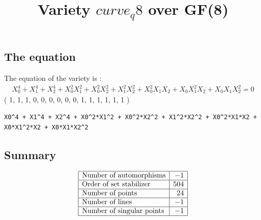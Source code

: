 \documentclass{article}
\newcommand\setTBstruts{\def\T{\rule{0pt}{2.6ex}}%
\def\B{\rule[-1.2ex]{0pt}{0pt}}}
\begin{document}
 
\setTBstruts



{\allowdisplaybreaks%






\title{Variety $curve_q8$ over GF(8)}
\author{}%
\maketitle%
%



\subsection*{The equation}
The equation of the variety  is :
{\renewcommand{\arraystretch}{1.5}
$$
\begin{array}{c}
X_0^4 + X_1^4 + X_2^4 + X_0^2X_1^2 + X_0^2X_2^2 + X_1^2X_2^2 + X_0^2X_1X_2 + X_0X_1^2X_2 + X_0X_1X_2^2=0
\end{array}
$$}
( 1, 1, 1, 0, 0, 0, 0, 0, 0, 1, 1, 1, 1, 1, 1 )\\
\begin{verbatim}
X0^4 + X1^4 + X2^4 + X0^2*X1^2 + X0^2*X2^2 + X1^2*X2^2 + X0^2*X1*X2 + X0*X1^2*X2 + X0*X1*X2^2
\end{verbatim}
\subsection*{Summary}
{\renewcommand{\arraystretch}{1.5}
$$
\begin{array}{|l|r|}
\hline
\mbox{Number of automorphisms} & -1\\
\hline
\mbox{Order of set stabilizer} & 504\\
\hline
\mbox{Number of points} & 24\\
\hline
\mbox{Number of lines} & -1 \\
\hline
\mbox{Number of singular points} & -1\\
\hline
\end{array}
$$}
}
\end{document}
